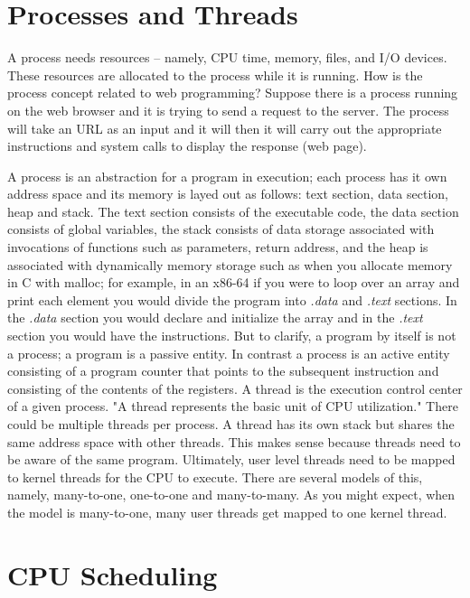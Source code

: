 \documentclass{amsbook}
\begin{document}
\section{Processes and Threads}

A process needs resources -- namely, CPU time, memory, files, and I/O devices. These resources are allocated to the process while it is running. How is the process concept related to web programming? Suppose there is a process running on the web browser and it is trying to send a request to the server. The process will take an URL as an input and it will then it will carry out the appropriate instructions and system calls to display the response (web page).

A process is an abstraction for a program in execution; each process has it own address space and its memory is layed out as follows: text section, data section, heap and stack. The text section consists of the executable code, the data section consists of global variables, the stack consists of data storage associated with invocations of functions such as parameters, return address, and the heap is associated with dynamically memory storage such as when you allocate memory in C with malloc; for example, in an x86-64 if you were to loop over an array and print each element you would divide the program into \textit{.data} and \textit{.text} sections. In the \textit{.data} section you would declare and initialize the array and in the \textit{.text} section you would have the instructions. But to clarify, a program by itself is not a process; a program is a passive entity. In contrast a process is an active entity consisting of a program counter that points to the subsequent instruction and consisting of the contents of the registers. A thread is the execution control center of a given process. "A thread represents the basic unit of CPU utilization." There could be multiple threads per process. A thread has its own stack but shares the same address space with other threads. This makes sense because threads need to be aware of the same program. Ultimately, user level threads need to be mapped to kernel threads for the CPU to execute. There are several models of this, namely, many-to-one, one-to-one and many-to-many. As you might expect, when the model is many-to-one, many user threads get mapped to one kernel thread.

\section{CPU Scheduling}
\end{document}
